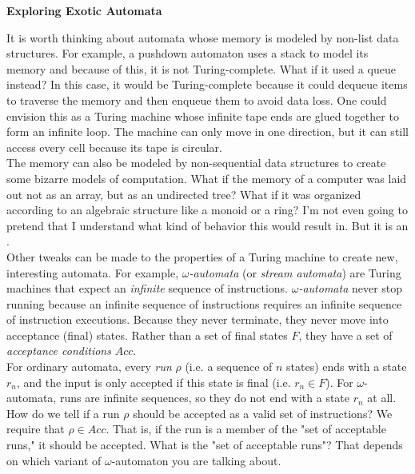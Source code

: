\begin{tcolorbox}[breakable, enhanced, colback=textbook-blue, sharp corners]
	\vspace{2mm}
	\begin{center}
		\textbf{Exploring Exotic Automata}
	\end{center}
	\vspace{1mm}
	It is worth thinking about automata whose memory is modeled by non-list data structures. For example, a pushdown automaton uses a stack to model its memory and because of this, it is not Turing-complete. What if it used a queue instead? In this case, it would be Turing-complete because it could dequeue items to traverse the memory and then enqueue them to avoid data loss. One could envision this as a Turing machine whose infinite tape ends are glued together to form an infinite loop. The machine can only move in one direction, but it can still access every cell because its tape is circular. \\
	
	The memory can also be modeled by non-sequential data structures to create some bizarre models of computation. What if the memory of a computer was laid out not as an array, but as an undirected tree? What if it was organized according to an algebraic structure like a monoid or a ring? I'm not even going to pretend that I understand what kind of behavior this would result in. But it is an . \\
	
	Other tweaks can be made to the properties of a Turing machine to create new, interesting automata. For example, \textit{$\omega$-automata} (or \textit{stream automata}) are Turing machines that expect an \textit{infinite} sequence of instructions. \textit{$\omega$-automata} never stop running because an infinite sequence of instructions requires an infinite sequence of instruction executions. Because they never terminate, they never move into acceptance (final) states. Rather than a set of final states $F$, they have a set of \textit{acceptance conditions} $Acc$. \\
	
	For ordinary automata, every \textit{run} $\rho$ (i.e. a sequence of $n$ states) ends with a state $r_n$, and the input is only accepted if this state is final (i.e. $r_n\in F$). For $\omega$-automata, runs are infinite sequences, so they do not end with a state $r_n$ at all. How do we tell if a run $\rho$ should be accepted as a valid set of instructions? We require that $\rho\in Acc$. That is, if the run is a member of the "set of acceptable runs," it should be accepted. What is the "set of acceptable runs"? That depends on which variant of $\omega$-automaton you are talking about. \\
	

\end{tcolorbox}
